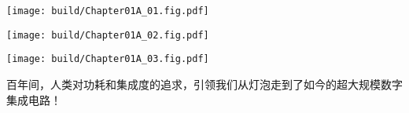\begin{Figure}[器件的发展]
    \begin{FigureSub}[真空管]
        \texttt{[image: build/Chapter01A\_01.fig.pdf]}
    \end{FigureSub}
    \hspace{0.5cm}
    \begin{FigureSub}[BJT]
        \texttt{[image: build/Chapter01A\_02.fig.pdf]}
    \end{FigureSub}
    \hspace{0.5cm}
    \begin{FigureSub}[MOSFET]
        \texttt{[image: build/Chapter01A\_03.fig.pdf]}
    \end{FigureSub}
\end{Figure}

百年间，人类对功耗和集成度的追求，引领我们从灯泡走到了如今的超大规模数字集成电路！



